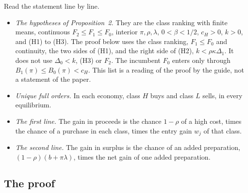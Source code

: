 Read the statement line by line.
\begin{itemize}
\item \emph{The hypotheses of Proposition~2.} They are the class ranking with finite means, continuous
\(F_2\le F_1\le F_0\), interior \(\pi,\rho,\lambda\), \(0<\beta<1/2\), \(c_H>0\), \(k>0\), and (H1) to (H3). The proof
below uses the class ranking, \(F_1\le F_0\) and continuity, the two sides of (H1), and the right side of (H2),
\(k<\rho\kappa\Delta_1\). It does not use \(\Delta_0<k\), (H3) or \(F_2\). The incumbent \(F_0\) enters only through
\(B_1(\pi)\le B_0(\pi)<c_H\). This list is a reading of the proof by the guide, not a statement of the paper.
\item \emph{Unique full orders.} In each economy, class \(H\) buys and class \(L\) sells, in every equilibrium.
\item \emph{The first line.} The gain in proceeds is the chance \(1-\rho\) of a high cost, times the chance of a
purchase in each class, times the entry gain \(w_j\) of that class.
\item \emph{The second line.} The gain in surplus is the chance of an added preparation, \((1-\rho)(b+\pi\lambda)\),
times the net gain of one added preparation.
\end{itemize}

\subsection{The proof}\label{sec:welfare-accessproof}

